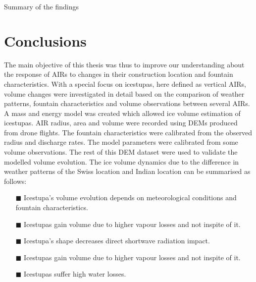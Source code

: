 Summary of the findings

\section{Conclusions}

The main objective of this thesis was thus to improve our understanding about the response of AIRs to changes in
their construction location and fountain characteristics. With a special focus on icestupas, here defined as
vertical AIRs, volume changes were investigated in detail based on the comparison of weather patterns, fountain
characteristics and volume observations between several AIRs. A mass and energy model was created which allowed
ice volume estimation of icestupas. AIR radius, area and volume were recorded using DEMs produced from drone
flights. The fountain characteristics were calibrated from the observed radius and discharge rates. The model
parameters were calibrated from some volume observations. The rest of this DEM dataset were used to validate the
modelled volume evolution. The ice volume dynamics due to the difference in weather patterns of the Swiss
location and Indian location can be summarised as follows: 


%  
%  

\begin{itemize} 

\item[\tiny{$\blacksquare$}] Icestupa's volume evolution depends on meteorological conditions and fountain
  characteristics.

\item[\tiny{$\blacksquare$}] Icestupas gain volume due to higher vapour losses and not inspite of it. 

\item[\tiny{$\blacksquare$}] Icestupa's shape decreases direct shortwave radiation impact.

\item[\tiny{$\blacksquare$}] Icestupas gain volume due to higher vapour losses and not inspite of it. 

\item[\tiny{$\blacksquare$}] Icestupas suffer high water losses.
 
\end{itemize}

